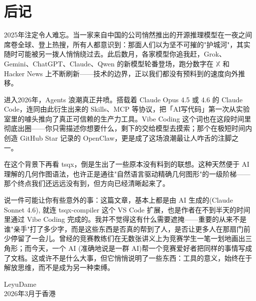 \documentclass[11pt,oneside]{ctexbook}
\begin{document}
\normalsize
\chapter*{后记}
2025年注定令人难忘。当一家来自中国的公司悄然推出的开源推理模型在一夜之间席卷全球、登上热搜，所有人都意识到：那面人们以为坚不可摧的"护城河"，其实随时可能被另一拨人悄悄绕过去。此后数月，各家模型你追我赶，Grok、Gemini、ChatGPT、Claude、Qwen 的新模型轮番登场，跑分数字在 $\mathbb{X}$ 和 Hacker News 上不断刷新——技术的边界，正以我们都没有预料到的速度向外推移。

进入2026年，Agents 浪潮真正井喷。搭载着 Claude Opus 4.5 或 4.6 的 Claude Code，连同由此衍生出来的 Skills、MCP 等协议，把「AI写代码」第一次从实验室里的噱头推向了真正可信赖的生产力工具。Vibe Coding 这个词也在这段时间里彻底出圈——你只需描述你想要什么，剩下的交给模型去摸索；那个在极短时间内创造 GitHub Star 记录的 OpenClaw，更是成了这场浪潮最让人咋舌的注脚之一。

在这个背景下再看 tsqx，倒是生出了一些原本没有料到的联想。这种天然便于 AI 理解的几何作图语法，也许正是通往"自然语言驱动精确几何图形"的一级阶梯——那个终点我们还远远没有到，但方向已经清晰起来了。

说一件可能让你有些意外的事：这篇文章，基本上都是由 AI 生成的(Claude Sonnet 4.6), 就连 tsqx-compiler 这个 VS Code 扩展，也是作者在不到半天的时间里通过 Vibe Coding 完成的。我并不觉得这有什么需要遮掩——重要的从来不是谁"亲手"打了多少字，而是这些东西是否真的帮到了人，是否让更多人在那扇门前少停留了一会儿。曾经的竞赛教练们在无数张讲义上为竞赛学生一笔一划地画出三角形；而今天，一个 AI (准确地说是一群 AI)帮一个竞赛爱好者把同样的事情写成了文档。这或许不是什么大事，但它悄悄说明了一些东西：工具的意义，始终在于解放思维，而不是成为另一种束缚。

\bigskip
\begin{flushright}
	LeyuDame\\
	2026年3月于香港
\end{flushright}
\end{document}
